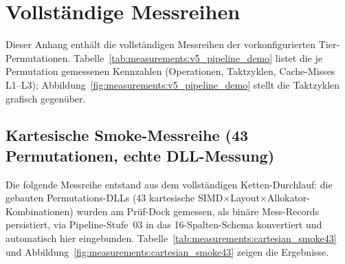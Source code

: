 \chapter{Vollst\"{a}ndige Messreihen}\label{app:measurements}


Dieser Anhang enth\"{a}lt die vollst\"{a}ndigen Messreihen der vorkonfigurierten
Tier-Permutationen. Tabelle~\ref{tab:measurements:v5_pipeline_demo} listet die je
Permutation gemessenen Kennzahlen (Operationen, Taktzyklen, Cache-Misses L1--L3);
Abbildung~\ref{fig:measurements:v5_pipeline_demo} stellt die Taktzyklen grafisch
gegen\"{u}ber.




\section{Kartesische Smoke-Messreihe (43 Permutationen, echte DLL-Messung)}

Die folgende Messreihe entstand aus dem vollst\"{a}ndigen Ketten-Durchlauf: die gebauten
Permutations-DLLs (43 kartesische SIMD$\times$Layout$\times$Allokator-Kombinationen) wurden am
Pr\"{u}f-Dock gemessen, als bin\"{a}re Mess-Records persistiert, via Pipeline-Stufe~03 in das
16-Spalten-Schema konvertiert und automatisch hier eingebunden.
Tabelle~\ref{tab:measurements:cartesian_smoke43} und
Abbildung~\ref{fig:measurements:cartesian_smoke43} zeigen die Ergebnisse.



